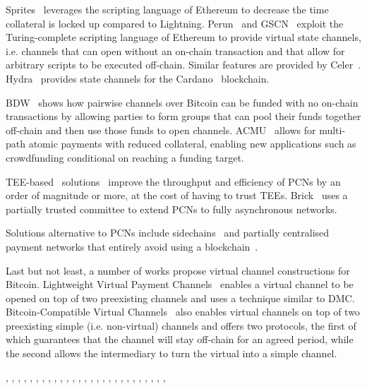   Sprites~\cite{sprites} leverages the scripting language of Ethereum to
  decrease the time collateral is locked up compared to Lightning.
  Perun~\cite{perun} and GSCN~\cite{DBLP:conf/ccs/DziembowskiFH18} exploit the
  Turing-complete scripting language of Ethereum to provide virtual state
  channels, i.e. channels that can open without an on-chain transaction and that
  allow for arbitrary scripts to be executed off-chain. Similar features are
  provided by Celer~\cite{dong2018celer}. Hydra~\cite{cryptoeprint:2020:299}
  provides state channels for the Cardano~\cite{cardano} blockchain.

  BDW~\cite{scalable-funding} shows how pairwise channels over Bitcoin can be
  funded with no on-chain transactions by allowing parties to form groups that
  can pool their funds together off-chain and then use those funds to open
  channels. ACMU~\cite{10.1145/3319535.3345666} allows for multi-path atomic
  payments with reduced collateral, enabling new applications such as
  crowdfunding conditional on reaching a funding target.

  TEE-based~\cite{zhao2019sok}
  solutions~\cite{teechan,10.1145/3341301.3359627,liao2021speedster,lee2020routee}
  improve the throughput and efficiency of PCNs by an order of magnitude or
  more, at the cost of having to trust TEEs. Brick~\cite{avarikioti2020brick}
  uses a partially trusted committee to extend PCNs to fully asynchronous
  networks.

  Solutions alternative to PCNs include sidechains~\cite{cryptoeprint:2020:175}
  and partially centralised payment networks that entirely avoid using a
  blockchain~\cite{DBLP:conf/trust/ArmknechtKMYZ15,stellar,silentwhispers,DBLP:conf/ndss/RoosMKG18}.

  Last but not least, a number of works propose virtual channel constructions
  for Bitcoin. Lightweight Virtual Payment
  Channels~\cite{10.1007/978-3-030-65411-5_18} enables a virtual channel to be
  opened on top of two preexisting channels and uses a technique similar to DMC.
  Bitcoin-Compatible Virtual Channels~\cite{cryptoeprint:2020:554} also enables
  virtual channels on top of two preexisting simple (i.e. non-virtual) channels
  and offers two protocols, the first of which guarantees that the channel will
  stay off-chain for an agreed period, while the second allows the intermediary
  to turn the virtual into a simple channel.

  \cite{DBLP:conf/fc/GudgeonMRMG20}, \cite{spider}, \cite{lightning},
  \cite{eltoo}, \cite{raiden}, \cite{bitcoin}, \cite{scaling}, \cite{decker},
  \cite{DBLP:conf/trust/ArmknechtKMYZ15}, \cite{stellar}, \cite{silentwhispers},
  \cite{DBLP:conf/ndss/RoosMKG18}, \cite{DBLP:conf/ccs/DziembowskiFH18},
  \cite{perun}, \cite{teechan}, \cite{sprites}, \cite{prihodko2016flare},
  \cite{DBLP:conf/ndss/MalavoltaMSKM19}, \cite{cryptoeprint:2020:175},
  \cite{cryptoeprint:2020:554}, \cite{cryptoeprint:2020:476},
  \cite{avarikioti2020brick}, \cite{10.1145/3319535.3345666},
  \cite{10.1007/978-3-030-65411-5_18}, \cite{cryptoeprint:2020:299},
  \cite{dong2018celer}, \cite{10.1145/3341301.3359627}, \cite{liao2021speedster}
